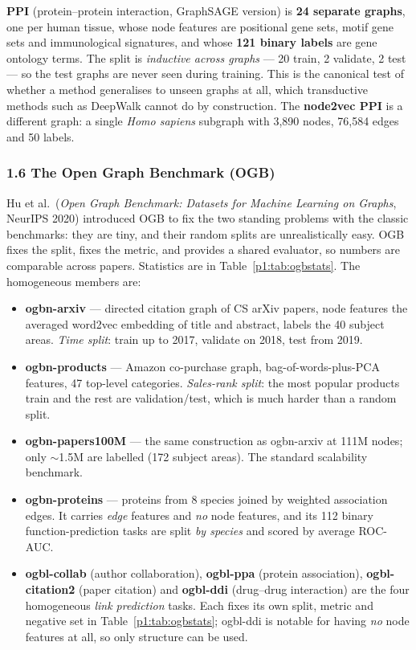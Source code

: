 \textbf{PPI} (protein--protein interaction, GraphSAGE version) is \textbf{24 separate
graphs}, one per human tissue, whose node features are positional gene sets, motif gene sets
and immunological signatures, and whose \textbf{121 binary labels} are gene ontology terms.
The split is \emph{inductive across graphs} --- 20 train, 2 validate, 2 test --- so the test
graphs are never seen during training. This is the canonical test of whether a method
generalises to unseen graphs at all, which transductive methods such as DeepWalk cannot do
by construction. The \textbf{node2vec PPI} is a different graph: a single \emph{Homo
sapiens} subgraph with 3{,}890 nodes, 76{,}584 edges and 50 labels.

\subsubsection*{1.6 The Open Graph Benchmark (OGB)}

Hu et al.\ (\emph{Open Graph Benchmark: Datasets for Machine Learning on Graphs},
NeurIPS 2020) introduced OGB to fix the two standing problems with the classic benchmarks:
they are tiny, and their random splits are unrealistically easy. OGB fixes the split, fixes
the metric, and provides a shared evaluator, so numbers are comparable across papers.
Statistics are in Table~\ref{p1:tab:ogbstats}. The homogeneous members are:

\begin{itemize}[label=$\bullet$,noitemsep,topsep=2pt]
  \item \textbf{ogbn-arxiv} --- directed citation graph of CS arXiv papers, node features
        the averaged word2vec embedding of title and abstract, labels the 40 subject areas.
        \emph{Time split}: train up to 2017, validate on 2018, test from 2019.
  \item \textbf{ogbn-products} --- Amazon co-purchase graph, bag-of-words-plus-PCA features,
        47 top-level categories. \emph{Sales-rank split}: the most popular products train
        and the rest are validation/test, which is much harder than a random split.
  \item \textbf{ogbn-papers100M} --- the same construction as ogbn-arxiv at 111M nodes;
        only $\sim$1.5M are labelled (172 subject areas). The standard scalability benchmark.
  \item \textbf{ogbn-proteins} --- proteins from 8 species joined by weighted association
        edges. It carries \emph{edge} features and \emph{no} node features, and its 112
        binary function-prediction tasks are split \emph{by species} and scored by
        average ROC-AUC.
  \item \textbf{ogbl-collab} (author collaboration), \textbf{ogbl-ppa} (protein
        association), \textbf{ogbl-citation2} (paper citation) and \textbf{ogbl-ddi}
        (drug--drug interaction) are the four homogeneous \emph{link prediction} tasks.
        Each fixes its own split, metric and negative set in Table~\ref{p1:tab:ogbstats};
        ogbl-ddi is notable for having \emph{no} node features at all, so only structure
        can be used.
\end{itemize}

